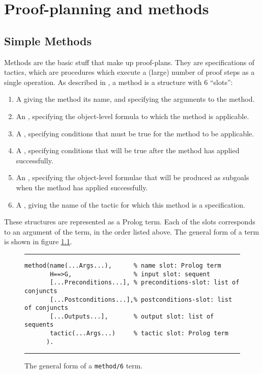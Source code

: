 
\chapter [Proof-planning] {Proof-planning and methods}

\section {Simple Methods}
\label{methods}
Methods are the basic stuff that make up proof-plans. They are
specifications of tactics, which are procedures which execute a
(large) number of proof steps as a single operation. As described in
\cite{pub349}, a method is a structure with 6 ``slots'':
\begin{enumerate}
\item
A {\em {}\/} giving the method its name, and specifying
the arguments to the method.
\item
An {\em {}}, specifying the object-level formula to
which the method is applicable.
\item
A {\em {}}, specifying conditions that must be
true for the method to be applicable.
\item
A {\em {}}, specifying conditions that will be
true after the method has applied successfully.
\item
An {\em {}}, specifying the object-level formulae that
will be produced as subgoals when the method has applied successfully.
\item
A {\em {}}, giving the name of the tactic for which
this method is a specification.
\end{enumerate}
These structures are represented as a Prolog  term.  Each
of the slots corresponds to an argument of the  term, in
the order listed above. The general form of a  term is
shown in figure \ref{method-fig}.

\begin{figure}[tb]
\hrule \vspace{1ex}
{\small\begin{verbatim}
method(name(...Args...),      % name slot: Prolog term 
       H==>G,                 % input slot: sequent 
       [...Preconditions...], % preconditions-slot: list of conjuncts
       [...Postconditions...],% postconditions-slot: list of conjuncts
       [...Outputs...],       % output slot: list of sequents
       tactic(...Args...)     % tactic slot: Prolog term
      ).
\end{verbatim}
} \caption{The general form of a {\tt method/6}
term.}
\label{method-fig}
\vspace{1ex} \hrule
\end{figure}


